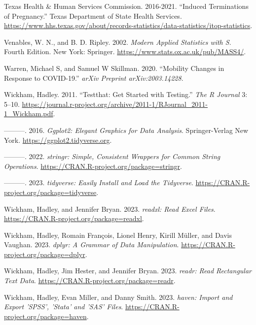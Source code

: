 \documentclass[
  letterpaper,
]{latex/krantz}
\newlength{\cslhangindent}
\newenvironment{CSLReferences}[2] %
 {\begin{list}{}{%
  \setlength{\itemindent}{0pt}
  \setlength{\leftmargin}{0pt}
  \setlength{\parsep}{0pt}
  \ifodd #1
   \setlength{\leftmargin}{\cslhangindent}
   \setlength{\itemindent}{-1\cslhangindent}
  \fi
  \setlength{\itemsep}{#2\baselineskip}}}
 {\end{list}}
\begin{document}
\begin{CSLReferences}{1}{0}
Texas Health \& Human Services Commission. 2016-2021. {``Induced
Terminations of Pregnancy.''} Texas Department of State Health Services.
\url{https://www.hhs.texas.gov/about/records-statistics/data-statistics/itop-statistics}.

Venables, W. N., and B. D. Ripley. 2002. \emph{{Modern Applied
Statistics with S}}. Fourth Edition. New York: Springer.
\url{https://www.stats.ox.ac.uk/pub/MASS4/}.

Warren, Michael S, and Samuel W Skillman. 2020. {``Mobility Changes in
Response to COVID-19.''} \emph{arXiv Preprint arXiv:2003.14228}.

Wickham, Hadley. 2011. {``Testthat: Get Started with Testing.''}
\emph{The R Journal} 3: 5--10.
\url{https://journal.r-project.org/archive/2011-1/RJournal_2011-1_Wickham.pdf}.

---------. 2016. \emph{Ggplot2: Elegant Graphics for Data Analysis}.
Springer-Verlag New York. \url{https://ggplot2.tidyverse.org}.

---------. 2022. \emph{{stringr: Simple, Consistent Wrappers for Common
String Operations}}. \url{https://CRAN.R-project.org/package=stringr}.

---------. 2023. \emph{{tidyverse: Easily Install and Load the
Tidyverse}}. \url{https://CRAN.R-project.org/package=tidyverse}.

Wickham, Hadley, and Jennifer Bryan. 2023. \emph{{readxl: Read Excel
Files}}. \url{https://CRAN.R-project.org/package=readxl}.

Wickham, Hadley, Romain François, Lionel Henry, Kirill Müller, and Davis
Vaughan. 2023. \emph{{dplyr: A Grammar of Data Manipulation}}.
\url{https://CRAN.R-project.org/package=dplyr}.

Wickham, Hadley, Jim Hester, and Jennifer Bryan. 2023. \emph{{readr:
Read Rectangular Text Data}}.
\url{https://CRAN.R-project.org/package=readr}.

Wickham, Hadley, Evan Miller, and Danny Smith. 2023. \emph{{haven:
Import and Export 'SPSS', 'Stata' and 'SAS' Files}}.
\url{https://CRAN.R-project.org/package=haven}.


\end{CSLReferences}
\end{document}
